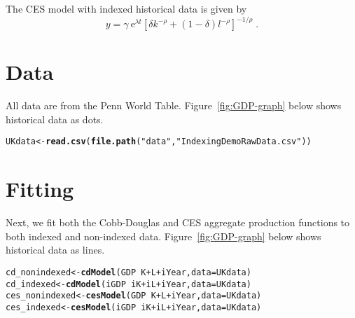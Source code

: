 \documentclass{article}\usepackage[]{graphicx}\usepackage[]{color}
\makeatletter
\newcommand{\hlstr}[1]{\textcolor[rgb]{0.192,0.494,0.8}{#1}}%
\newcommand{\hlopt}[1]{\textcolor[rgb]{0,0,0}{#1}}%
\newcommand{\hlstd}[1]{\textcolor[rgb]{0.345,0.345,0.345}{#1}}%
\newcommand{\hlkwb}[1]{\textcolor[rgb]{0.69,0.353,0.396}{#1}}%
\newcommand{\hlkwc}[1]{\textcolor[rgb]{0.333,0.667,0.333}{#1}}%
\newcommand{\hlkwd}[1]{\textcolor[rgb]{0.737,0.353,0.396}{\textbf{#1}}}%
\newenvironment{kframe}{%
 \def\at@end@of@kframe{}%
 \ifinner\ifhmode%
  \def\at@end@of@kframe{\end{minipage}}%
  \begin{minipage}{\columnwidth}%
 \fi\fi%
 \def\FrameCommand##1{\hskip\@totalleftmargin \hskip-\fboxsep
 \colorbox{shadecolor}{##1}\hskip-\fboxsep
     \hskip-\linewidth \hskip-\@totalleftmargin \hskip\columnwidth}%
 \MakeFramed {\advance\hsize-\width
   \@totalleftmargin\z@ \linewidth\hsize
   \@setminipage}}%
 {\par\unskip\endMakeFramed%
 \at@end@of@kframe}
\newenvironment{knitrout}{}{} %
\makeatother
\begin{document}
The CES model with indexed historical data is given by 
%
\begin{equation} \label{eq:CESkl}
  y = \gamma \: \mathrm{e}^{\lambda t} \left[\delta k^{-\rho}
      + (1-\delta)l^{-\rho} \right]^{-1/\rho} \; .
\end{equation}


\section{Data} 
\label{sec:data}

All data are from the Penn World Table.
Figure~\ref{fig:GDP-graph} below shows historical data as dots.

\begin{knitrout}
\color{fgcolor}\begin{kframe}
\begin{alltt}
\hlstd{UKdata} \hlkwb{<-} \hlkwd{read.csv}\hlstd{(}\hlkwd{file.path}\hlstd{(}\hlstr{"data"}\hlstd{,} \hlstr{"IndexingDemoRawData.csv"}\hlstd{))}
\end{alltt}
\end{kframe}
\end{knitrout}


\section{Fitting} 
\label{sec:fitting}

Next, we fit both the Cobb-Douglas and CES aggregate production functions 
to both indexed and non-indexed data.
Figure~\ref{fig:GDP-graph} below shows historical data as lines.

\begin{knitrout}
\color{fgcolor}\begin{kframe}
\begin{alltt}
\hlstd{cd_nonindexed} \hlkwb{<-} \hlkwd{cdModel}\hlstd{(GDP} \hlopt{~} \hlstd{K} \hlopt{+} \hlstd{L} \hlopt{+} \hlstd{iYear,} \hlkwc{data} \hlstd{= UKdata)}
\hlstd{cd_indexed} \hlkwb{<-} \hlkwd{cdModel}\hlstd{(iGDP} \hlopt{~} \hlstd{iK} \hlopt{+} \hlstd{iL} \hlopt{+} \hlstd{iYear,} \hlkwc{data} \hlstd{= UKdata)}
\hlstd{ces_nonindexed} \hlkwb{<-} \hlkwd{cesModel}\hlstd{(GDP} \hlopt{~} \hlstd{K} \hlopt{+} \hlstd{L} \hlopt{+} \hlstd{iYear,} \hlkwc{data} \hlstd{= UKdata)}
\hlstd{ces_indexed} \hlkwb{<-} \hlkwd{cesModel}\hlstd{(iGDP} \hlopt{~} \hlstd{iK} \hlopt{+} \hlstd{iL} \hlopt{+} \hlstd{iYear,} \hlkwc{data} \hlstd{= UKdata)}
\end{alltt}
\end{kframe}
\end{knitrout}
\end{document}
